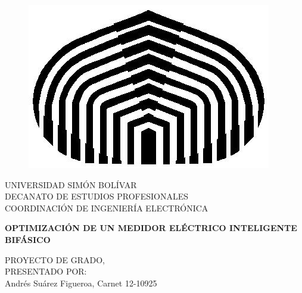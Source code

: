 \begin{figure}[ht]
    \begin{center}
        \includegraphics[scale=0.25]{../Imagenes/cebolla.jpg}
    \end{center}
\end{figure}

\vspace{-1.cm}
     \begin{center}
		\begin{small}
			UNIVERSIDAD SIMÓN BOLÍVAR\\
    		DECANATO DE ESTUDIOS PROFESIONALES\\
	  		COORDINACIÓN DE INGENIERÍA ELECTRÓNICA\\
		\end{small}
    \end{center}

    \vspace{-0.4cm}
    \begin{center}
    \small {
    \textbf{OPTIMIZACIÓN DE UN MEDIDOR ELÉCTRICO INTELIGENTE BIFÁSICO}\\
    }
    \end{center}

		\vspace{-0.4cm}
    \begin{center}
    \small {
    PROYECTO DE GRADO,\\
		PRESENTADO POR:\\
Andrés Suárez Figueroa, Carnet 12-10925\\
    }
    \end{center}


